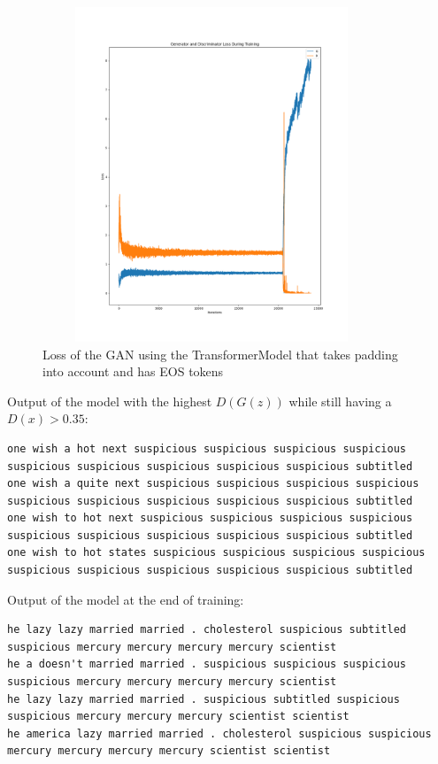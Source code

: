 \documentclass{article}
\begin{document}
\begin{figure}[ht]
    \centering
    \captionsetup{width=0.7\textwidth}
    \includegraphics[width=0.9\textwidth, height=10cm]{GAN-loss-double_batch-Adam-no_random.png}
    \caption{%
        Loss of the GAN using the TransformerModel that takes padding into
        account and has EOS tokens
    }\label{fig:ganPaddingEOS}
\end{figure}






Output of the model with the highest $D(G(z))$ while still having a $D(x) > 0.35$:
\scriptsize
\begin{verbatim}
one wish a hot next suspicious suspicious suspicious suspicious suspicious suspicious suspicious suspicious suspicious subtitled
one wish a quite next suspicious suspicious suspicious suspicious suspicious suspicious suspicious suspicious suspicious subtitled
one wish to hot next suspicious suspicious suspicious suspicious suspicious suspicious suspicious suspicious suspicious subtitled
one wish to hot states suspicious suspicious suspicious suspicious suspicious suspicious suspicious suspicious suspicious subtitled
\end{verbatim}
\normalsize

Output of the model at the end of training:
\footnotesize
\begin{verbatim}
he lazy lazy married married . cholesterol suspicious subtitled suspicious mercury mercury mercury mercury scientist
he a doesn't married married . suspicious suspicious suspicious suspicious mercury mercury mercury mercury scientist
he lazy lazy married married . suspicious subtitled suspicious suspicious mercury mercury mercury scientist scientist
he america lazy married married . cholesterol suspicious suspicious mercury mercury mercury mercury scientist scientist
\end{verbatim}
\normalsize
\end{document}
